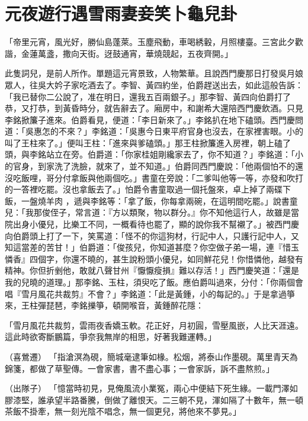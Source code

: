 %

\chapter{元夜遊行遇雪雨\KG 妻妾笑卜龜兒卦}

「帝里元宵，風光好，勝仙島蓬萊。玉塵飛動，車喝綉轂，月照樓臺。三宮此夕歡諧，金蓮萬盞，撒向天街。迓鼓通宵，華燒競起，五夜齊開。」

此隻詞兒，是前人所作。單題這元宵景致，人物繁華。且說西門慶那日打發吳月娘眾人，往吳大妗子家吃酒去了。李智、黃四約坐，伯爵趕送出去，如此這般告訴：「我已替你二公說了，准在明日，還我五百兩銀子。」那李智、黃四向伯爵打了恭，又打恭，到黃昏時分，就告辭去了。廂房中，和謝希大還陪西門慶飲酒。只見李銘掀簾子進來。伯爵看見，便道：「李日新來了。」李銘扒在地下磕頭。西門慶問道：「吳惠怎的不來？」李銘道：「吳惠今日東平府官身也沒去，在家裡害眼。小的叫了王柱來了。」便叫王柱：「進來與爹磕頭。」那王柱掀簾進入房裡，朝上磕了頭，與李銘站立在旁。伯爵道：「你家桂姐剛纔家去了，你不知道？」李銘道：「小的官身，到家洗了洗臉，就來了，並不知道。」伯爵同西門慶說：「他兩個怕不的還沒吃飯哩，哥分付拿飯與他兩個吃。」書童在旁說：「二爹叫他等一等，亦發和吹打的一答裡吃罷。沒也拿飯去了。」怕爵令書童取過一個托盤來，卓上掉了兩碟下飯，一盤燒羊肉 ，遞與李銘等：「拿了飯，你每拿兩碗，在這明間吃罷。」說書童兒：「我那俊侄子，常言道：『方以類聚，物以群分。』你不知他這行人，故雖是當院出身小優兒，比樂工不同，一概看待也罷了，顯的說你我不幫襯了。」被西門慶向伯爵頭上打了一下，笑罵道：「怪不的你這狗材，行記中人，只護行記中人，又知這當差的苦甘！」伯爵道：「俊孩兒，你知道甚麼？你空做子弟一場，連『惜玉憐香』四個字，你還不曉的，甚生說粉頭小優兒，如同鮮花兒！你惜憐他，越發有精神。你但折剉他，敢就八聲甘州『懨懨瘦損』難以存活！」西門慶笑道：「還是我的兒曉的道理。」那李銘、玉柱，須臾吃了飯。應伯爵叫過來，分付：「你兩個會唱『雪月風花共裁剪』不會？」李銘道：「此是黃鍾，小的每記的。」于是拿過箏來，王柱彈琵琶，李銘擽箏，頓開喉音，黃鍾醉花隱：

「雪月風花共裁剪，雲雨夜香嬌玉軟。花正好，月初圓，雪壓風嵌，人比天涯遠。這此時欲寄斷鵬篇，爭奈我無岸的相思，好著我難運轉。」

（喜鶯遷）  「指滄溟為硯，簡城毫逮筆如椽。松烟，將泰山作墨硯。萬里青天為錦箋，都做了草聖傳。一會家書，書不盡心事；一會家訴，訴不盡熬煎。」

（出隊子）  「憶當時初見，見俺風流小業冤，兩心中便結下死生緣。一載門澤如膠漆堅，誰承望半路番騰，倒做了離恨天。二三朝不見，渾如隔了十數年，無一頓茶飯不掛牽，無一刻光陰不唱念，無一個更兒，將他來不夢見。」

